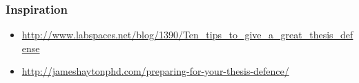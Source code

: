 \begin{frame}
  \frametitle{Inspiration}
%
\begin{itemize}
\item {\small \url{http://www.labspaces.net/blog/1390/Ten_tips_to_give_a_great_thesis_defense}}
\item {\small \url{http://jameshaytonphd.com/preparing-for-your-thesis-defence/}}
\end{itemize}
%
\end{frame}
